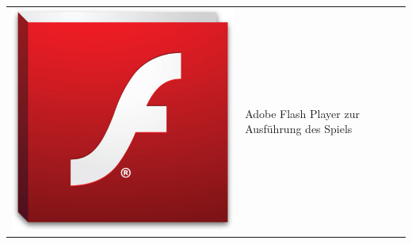 \documentclass[a4paper, 11pt]{article} %
\begin{document}
\begin{tabular}{lp{9cm}}
\includegraphics[scale=0.13]{images/flash_player.png} & 
\nohyphens{
Adobe Flash Player zur Ausführung des Spiels
} \\
\end{tabular} 
\end{document}
